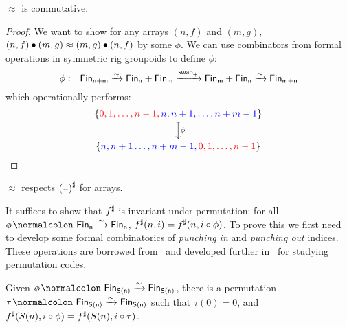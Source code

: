 \begin{proposition}\label{bag:comm}
    $\approx$ is commutative.
\end{proposition}

\begin{proof}
    We want to show for any arrays $(n, f)$ and $(m, g)$, $(n, f) \mathbin{\bullet} (m, g) \approx (m, g) \mathbin{\bullet} (n, f)$
    by some $\phi$.
    We can use combinators from formal operations in symmetric rig groupoids \cite{choudhurySymmetriesReversibleProgramming2022} to define $\phi$:
    \[
        \phi \defeq \Fin[n+m] \xto{\sim} \Fin[n] + \Fin[m] \xto{\term{swap}_{+}} \Fin[m] + \Fin[n] \xto{\sim} \Fin[m+n] \\
    \]
    which operationally performs:
    \[
        \begin{tikzcd}[ampersand replacement=\&,cramped]
            {\{\color{red}0,1,\dots,n-1, \color{blue} n,n+1,\dots,n+m-1 \color{black}\}} \\
            { \{\color{blue}n,n+1\dots,n+m-1, \color{red}0,1,\dots,n-1 \color{black}\}}
            \arrow["\phi", maps to, from=1-1, to=2-1]
        \end{tikzcd}
    \]
\end{proof}

\begin{proposition}
    $\approx$ respects $\ext{(\blank)}$ for arrays.
\end{proposition}
\noindent
It suffices to show that ${f}^{\sharp}$ is invariant under permutation: for all $\phi\colon \Fin[n]\xto{\sim}\Fin[n]$,
$\ext{f}(n, i) \id \ext{f}(n, i \circ \phi)$. To prove this we first need to develop some formal combinatorics of
\emph{punching in} and \emph{punching out} indices. These operations are
borrowed from~\cite{mozlerCubicalAgdaSimple2021} and
developed further
in~\cite{choudhurySymmetriesReversibleProgramming2022} for studying permutation codes.

\begin{lemma}\label{bag:tau}
    Given $\phi\colon \Fin[S(n)]\xto{\sim}\Fin[S(n)]$, there is a permutation $\tau\colon \Fin[S(n)]\xto{\sim}\Fin[S(n)]$
    such that $\tau(0) = 0$, and ${f}^{\sharp}(S(n), i \circ \phi) = {f}^{\sharp}(S(n), i \circ \tau)$.
\end{lemma}

